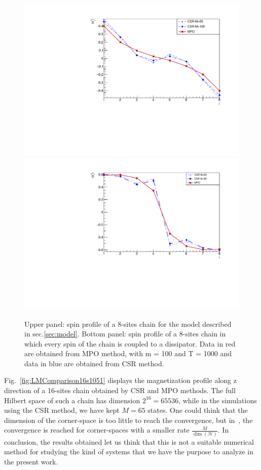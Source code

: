 \begin{figure}[H]
    \centering
    \includegraphics[scale=0.6]{Figures/8sites/1U1D_comparisonCSR_MPO_8site.pdf}
    \includegraphics[scale=0.6]{Figures/8sites/8sites_MPOvsCORNER_4U4D.pdf}
    \captionsetup{width=1.\linewidth}
    \caption{Upper panel: spin profile of a 8-sites chain for the model described in sec.\ref{sec:model}. Bottom panel: spin profile of a 8-sites chain in which every spin of the chain is coupled to a dissipator. Data in red are obtained from MPO method, with m = 100 and T = 1000 and data in blue are obtained from CSR method.}
    \label{fig:comparisonCSR_MPO_8site}
\end{figure}

Fig.~\ref{fig:LMComparison16s1051} displays the magnetization profile along z direction of a 16-sites chain obtained by CSR and MPO methods. The full Hilbert space of such a chain has dimension $2^{16} = 65536$, while in the simulations using the CSR method, we have kept $M = 65$ states. One could think that the dimension of the corner-space is too little to reach the convergence, but in~\cite{PhysRevLett.115.080604}, the convergence is reached for corner-spaces with a smaller rate $\frac{M}{\dim(\mathcal{H})}$. In conclusion, the results obtained let us think that this is not a suitable numerical method for studying the kind of systems that we have the purpose to analyze in the present work.


